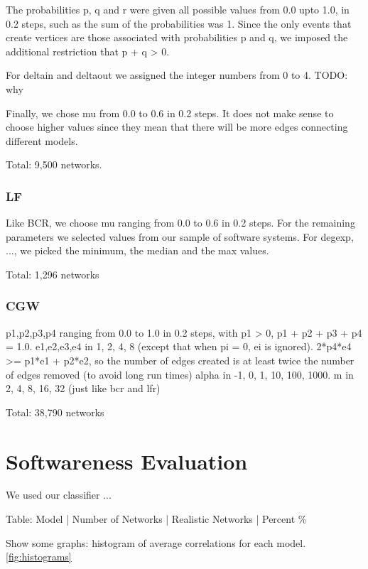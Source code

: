
The probabilities p, q and r were given all possible values from 0.0 upto 1.0,
in 0.2 steps, such as the sum of the probabilities was 1. Since the only events
that create vertices are those associated with probabilities p and q, we imposed
the additional restriction that p + q > 0.

For deltain and deltaout we assigned the integer numbers from 0 to 4. TODO: why

Finally, we chose mu from 0.0 to 0.6 in 0.2 steps. It does not make sense to
choose higher values since they mean that there will be more edges connecting
different models.

Total: 9,500 networks.

\subsubsection{LF}

Like BCR, we choose mu ranging from 0.0 to 0.6 in 0.2 steps. For the remaining
parameters we selected values from our sample of software systems. For degexp,
..., we picked the minimum, the median and the max values.

Total: 1,296 networks

\subsubsection{CGW}

p1,p2,p3,p4 ranging from 0.0 to 1.0 in 0.2 steps, with p1 > 0, p1 + p2 + p3 + p4 = 1.0.
e1,e2,e3,e4 in 1, 2, 4, 8 (except that when pi = 0, ei is ignored).
2*p4*e4 >= p1*e1 + p2*e2, so the number of edges created is at least twice
the number of edges removed (to avoid long run times)
alpha in -1, 0, 1, 10, 100, 1000. 
m in 2, 4, 8, 16, 32 (just like bcr and lfr)

Total: 38,790 networks

\section{Softwareness Evaluation}

We used our classifier ...

Table: Model | Number of Networks | Realistic Networks | Percent \%

Show some graphs: histogram of average correlations for each model.
\ref{fig:histograms}


